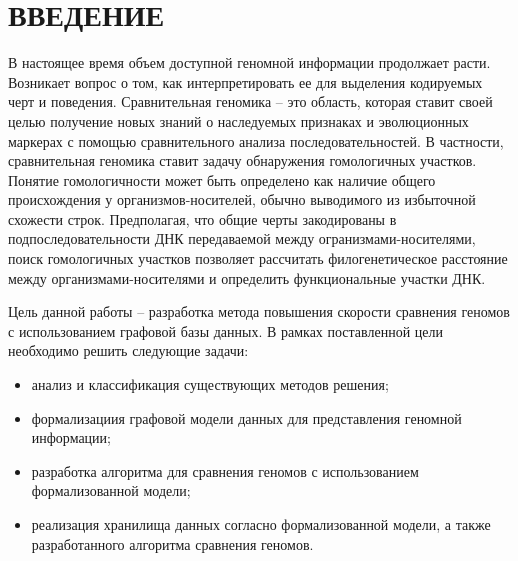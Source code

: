 \section*{ВВЕДЕНИЕ}
	В настоящее время объем доступной геномной информации продолжает расти. Возникает вопрос о том, как интерпретировать ее для выделения кодируемых черт и поведения. Сравнительная геномика -- это область, которая ставит своей целью получение новых знаний о наследуемых признаках и эволюционных маркерах с помощью сравнительного анализа последовательностей\cite{1_hardison2003comparative}. В частности, сравнительная геномика ставит задачу обнаружения гомологичных участков. Понятие гомологичности может быть определено как наличие общего происхождения\cite{1_hardison2003comparative} у организмов-носителей, обычно выводимого из избыточной схожести строк\cite{2_pearson2013introduction}. Предполагая, что общие черты закодированы в подпоследовательности ДНК передаваемой между огранизмами-носителями, поиск гомологичных участков позволяет рассчитать филогенетическое расстояние\cite{1_hardison2003comparative,2_pearson2013introduction} между организмами-носителями и определить функциональные участки ДНК\cite{1_hardison2003comparative,2_pearson2013introduction}.
	
	Цель данной работы -- разработка метода повышения скорости сравнения геномов с использованием графовой базы данных. В рамках поставленной цели необходимо решить следующие задачи:
	\begin{itemize}
		\item анализ и классификация существующих методов решения;
		\item формализациия графовой модели данных для представления геномной информации;
		\item разработка алгоритма для сравнения геномов с использованием формализованной модели;
		\item реализация хранилища данных согласно формализованной модели, а также разработанного алгоритма сравнения геномов.
	\end{itemize}
\pagebreak